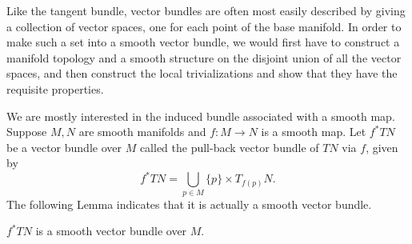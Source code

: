 \documentclass{ctexart}
\begin{document}
Like the tangent bundle, vector bundles are often most easily described by giving a collection of vector spaces, one for each point of the base manifold. 
In order to make such a set into a smooth vector bundle, we would first have to construct a manifold topology and a smooth structure 
on the disjoint union of all the vector spaces, and then construct the local trivializations and show that they have the requisite properties. 

We are mostly interested in the induced bundle associated with a smooth map. Suppose $M, N$ are smooth manifolds and $f:M\rightarrow N$ is a smooth map. Let $f^*TN$ be
a vector bundle over $M$ called the pull-back vector bundle of $TN$ via $f$, given by 
$$
f^*TN=\bigcup_{p\in M}\{p\}\times T_{f(p)}N.
$$
The following Lemma indicates that it is actually a smooth vector bundle.
\begin{lemma}
  $f^*TN$ is a smooth vector bundle over $M$.
\end{lemma}
\end{document}
